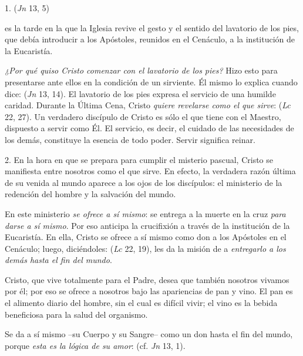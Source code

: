 \begin{body}
1.  (\textit{Jn} 13, 5) 

 es la tarde en la que la Iglesia revive el gesto y el sentido del lavatorio de los pies, que debía introducir a los Apóstoles, reunidos en el Cenáculo, a la institución de la Eucaristía. 

\textit{¿Por qué quiso Cristo comenzar con el lavatorio de los pies?} Hizo esto para presentarse ante ellos en la condición de un sirviente. Él mismo lo explica cuando dice:  (\textit{Jn} 13, 14). El lavatorio de los pies expresa el servicio de una humilde caridad. Durante la Última Cena, Cristo \textit{quiere revelarse como el que sirve}:  (\textit{Lc} 22, 27). Un verdadero discípulo de Cristo es sólo el que tiene  con el Maestro, dispuesto a servir como Él. El servicio, es decir, el cuidado de las necesidades de los demás, constituye la esencia de todo poder. Servir significa reinar. 

2. En la hora en que se prepara para cumplir el misterio pascual, Cristo se manifiesta entre nosotros como el que sirve. En efecto, la verdadera razón última de su venida al mundo aparece a los ojos de los discípulos: el ministerio de la redención del hombre y la salvación del mundo. 

En este ministerio \textit{se ofrece a sí mismo}: se entrega a la muerte en la cruz \textit{para darse a sí mismo}. Por eso anticipa la crucifixión a través de la institución de la Eucaristía. En ella, Cristo se ofrece a sí mismo como don a los Apóstoles en el Cenáculo; luego, diciéndoles:  (\textit{Lc} 22, 19), les da la misión de a \textit{entregarlo a los demás hasta el fin del mundo}. 

Cristo, que vive totalmente para el Padre, desea que también nosotros vivamos por él; por eso se ofrece a nosotros bajo las apariencias de pan y vino. El pan es el alimento diario del hombre, sin el cual es difícil vivir; el vino es la bebida beneficiosa para la salud del organismo. 

Se da a sí mismo –su Cuerpo y su Sangre– como un don hasta el fin del mundo, porque \textit{esta es la lógica de su amor}:  (cf. \textit{Jn} 13, 1). 


\end{body}

